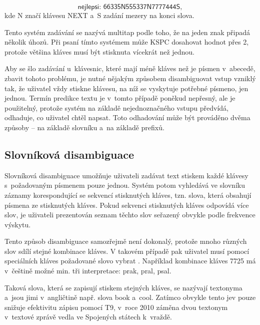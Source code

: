 \documentclass[a4paper,11pt,openany]{book} %
\newcommand\exmp{\textsf}
\begin{document}
\[
	\exmp{nejlepsi: 66335N555337N7777444S},
\]
kde \exmp{N} značí klávesu \exmp{NEXT} a~\exmp{S} zadání mezery na konci slova.

Tento systém zadávání se nazývá multitap podle toho, že na jeden znak připadá několik úhozů. Při psaní tímto systémem může KSPC dosahovat hodnot přes 2, protože většina kláves musí být stisknuta vícekrát než jednou. \parencite[202]{mackenzie2002kspc}

Aby se šlo zadávání u~klávesnic, které mají méně kláves než je písmen v~abecedě, zbavit tohoto problému, je nutné nějakým způsobem disambiguovat vstup vzniklý tak, že uživatel vždy stiskne klávesu, na níž se vyskytuje potřebné písmeno, jen jednou. Termín predikce textu je v~tomto případě poněkud nepřesný, ale je použitelný, protože systém na základě nejednoznačného vstupu předvídá, odhaduje, co uživatel chtěl napsat. Toto odhadování může být prováděno dvěma způsoby -- na základě slovníku a~na základě prefixů.

\subsection{Slovníková disambiguace}

Slovníková disambiguace umožňuje uživateli zadávat text stiskem každé klávesy s~požadovaným písmenem pouze jednou. Systém potom vyhledává ve slovníku záznamy korespondující se sekvencí stisknutých kláves, tzn. slova, která obsahují písmena ze stisknutých kláves. Pokud sekvenci stisknutých kláves odpovídá více slov, je uživateli prezentován seznam těchto slov seřazený obvykle podle frekvence výskytu. %

Tento způsob disambiguace samozřejmě není dokonalý, protože mnoho různých slov sdílí stejné kombinace kláves. V takovém případě pak uživatel musí pomocí speciálních kláves požadované slovo vybrat \parencite{MacKenzie2001}. Například kombinace kláves \exmp{7725} má v~češtině možné min. tři interpretace: \exmp{prak, pral, psal}.

Taková slova, která se zapisují stiskem stejných kláves, se nazývají textonyma \parencite{ericzorn2007} a~jsou jimi v~angličtině např. slova \exmp{book} a~\exmp{cool}. Zatímco obvykle tento jev pouze snižuje efektivitu zápisu pomocí T9, v~roce 2010 záměna dvou textonym v~textové zprávě vedla ve Spojených státech k~vraždě. \parencite{t9kill}
\end{document}
